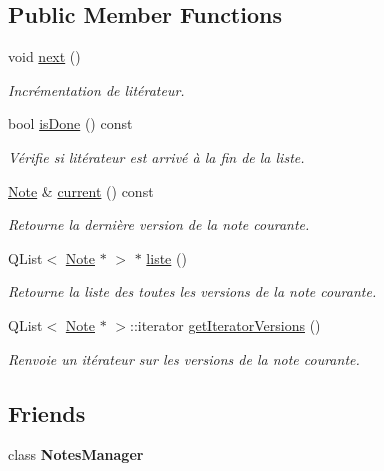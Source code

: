 \subsection*{Public Member Functions}
\begin{DoxyCompactItemize}
\item 
\mbox{\label{class_notes_manager_1_1_iterator_a4a6d6c9d3120acf8052728c0212b5ccd}} 
void \hyperlink{class_notes_manager_1_1_iterator_a4a6d6c9d3120acf8052728c0212b5ccd}{next} ()
\begin{DoxyCompactList}\small\item\em Incrémentation de l\textquotesingle{}itérateur. \end{DoxyCompactList}\item 
bool \hyperlink{class_notes_manager_1_1_iterator_a09b30631af5b7627b2b5a655a8ac450d}{is\+Done} () const
\begin{DoxyCompactList}\small\item\em Vérifie si l\textquotesingle{}itérateur est arrivé à la fin de la liste. \end{DoxyCompactList}\item 
\hyperlink{class_note}{Note} \& \hyperlink{class_notes_manager_1_1_iterator_a4fd73444f2edd5f196d7b950527f5a90}{current} () const
\begin{DoxyCompactList}\small\item\em Retourne la dernière version de la note courante. \end{DoxyCompactList}\item 
Q\+List$<$ \hyperlink{class_note}{Note} $\ast$ $>$ $\ast$ \hyperlink{class_notes_manager_1_1_iterator_a99e3eb098c3b5c7b3041731d10a18c88}{liste} ()
\begin{DoxyCompactList}\small\item\em Retourne la liste des toutes les versions de la note courante. \end{DoxyCompactList}\item 
Q\+List$<$ \hyperlink{class_note}{Note} $\ast$ $>$\+::iterator \hyperlink{class_notes_manager_1_1_iterator_a09a650ca2eeca614a4129ed5e1795e96}{get\+Iterator\+Versions} ()
\begin{DoxyCompactList}\small\item\em Renvoie un itérateur sur les versions de la note courante. \end{DoxyCompactList}\end{DoxyCompactItemize}
\subsection*{Friends}
\begin{DoxyCompactItemize}
\item 
\mbox{\label{class_notes_manager_1_1_iterator_a017a5144e8cfa6087305055ab968ef41}} 
class {\bfseries Notes\+Manager}
\end{DoxyCompactItemize}


